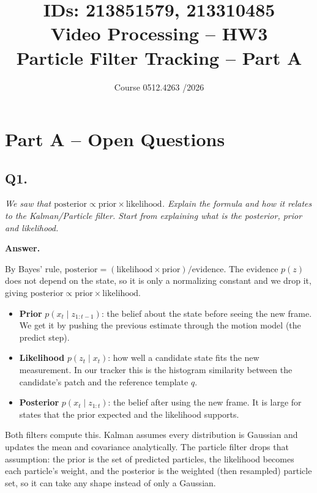 \documentclass[11pt]{article}
\title{
    \normalsize IDs: 213851579, 213310485 \\[1em] 
    \huge Video Processing -- HW3 \\
    \large Particle Filter Tracking -- Part A
}
\author{}
\date{Course 0512.4263 \quad 2025/2026}
\begin{document}
\maketitle

\section*{Part A -- Open Questions}

\subsection*{Q1.}
\noindent\textit{We saw that $\text{posterior} \propto \text{prior} \times \text{likelihood}$. Explain the formula
and how it relates to the Kalman/Particle filter. Start from explaining what is the posterior,
prior and likelihood.}

\medskip
\noindent\textbf{Answer.}

By Bayes' rule, $\text{posterior} = (\text{likelihood} \times \text{prior}) / \text{evidence}$. The evidence $p(z)$ does
not depend on the state, so it is only a normalizing constant and we drop it, giving
$\text{posterior} \propto \text{prior} \times \text{likelihood}$.

\begin{itemize}[nosep]
    \item \textbf{Prior} $p(x_t \mid z_{1:t-1})$: the belief about the state before seeing the
    new frame. We get it by pushing the previous estimate through the motion model (the
    predict step).
    \item \textbf{Likelihood} $p(z_t \mid x_t)$: how well a candidate state fits the new
    measurement. In our tracker this is the histogram similarity between the candidate's
    patch and the reference template $q$.
    \item \textbf{Posterior} $p(x_t \mid z_{1:t})$: the belief after using the new frame. It is
    large for states that the prior expected and the likelihood supports.
\end{itemize}

Both filters compute this. Kalman assumes every distribution is Gaussian and updates the mean
and covariance analytically. The particle filter drops that assumption: the prior is the set of
predicted particles, the likelihood becomes each particle's weight, and the posterior is the
weighted (then resampled) particle set, so it can take any shape instead of only a Gaussian.
\end{document}

